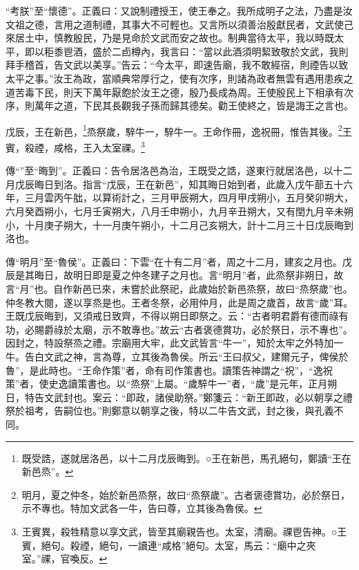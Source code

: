 {\noindent\shu{}\fzkt “考朕”至“懷德”。正義曰：又說制禮授王，使王奉之。我所成明子之法，乃盡是汝文祖之德，言用之道制禮，其事大不可輕也。又言所以須善治殷獻民者，文武使己來居土中，慎教殷民，乃是見命於文武而安之故也。制典當待太平，我以時既太平，即以秬黍鬯酒，盛於二卣樽內，我言曰：“當以此酒須明絜致敬於文武，我則拜手稽首，告文武以美享。”告云：“今太平，即速告廟，我不敢經宿，則禋告以致太平之事。”汝王為政，當順典常厚行之，使有次序，則諸為政者無雲有遇用患疾之道苦毒下民，則天下萬年厭飽於汝王之德，殷乃長成為周。王使殷民上下相承有次序，則萬年之道，下民其長觀我子孫而歸其德矣。勸王使終之，皆是誨王之言也。 \par}

戊辰，王在新邑，\footnote{既受誥，遂就居洛邑，以十二月戊辰晦到。○王在新邑，馬孔絕句，鄭讀“王在新邑烝”。}烝祭歲，騂牛一，騂牛一。王命作冊，逸祝冊，惟告其後。\footnote{明月，夏之仲冬，始於新邑烝祭，故曰“烝祭歲”。古者褒德賞功，必於祭日，示不專也。特加文武各一牛，告曰尊，立其後為魯侯。}王賓，殺禋，咸格，王入太室祼。\footnote{王賓異，殺牲精意以享文武，皆至其廟親告也。太室，清廟。祼鬯告神。○王賓，絕句。殺禋，絕句，一讀連“咸格”絕句。太室，馬云：“廟中之夾室。”祼，官喚反。}


{\noindent\zhuan{}\fzbyks 傳“”至“晦到”。正義曰：告令居洛邑為治，王既受之誥，遂東行就居洛邑，以十二月戊辰晦日到洛。指言“戊辰，王在新邑”，知其晦日始到者，此歲入戊午蔀五十六年，三月雲丙午朏，以算術計之，三月甲辰朔大，四月甲戌朔小，五月癸卯朔大，六月癸酉朔小，七月壬寅朔大，八月壬申朔小，九月辛丑朔大，又有閏九月辛未朔小，十月庚子朔大，十一月庚午朔小，十二月己亥朔大，計十二月三十日戊辰晦到洛也。 \par}

{\noindent\zhuan{}\fzbyks 傳“明月”至“魯侯”。正義曰：下雲“在十有二月”者，周之十二月，建亥之月也。戊辰是其晦日，故明日即是夏之仲冬建子之月也。言“明月”者，此烝祭非朔日，故言“月”也。自作新邑已來，未嘗於此祭祀，此歲始於新邑烝祭，故曰“烝祭歲”也。仲冬教大閱，遂以享烝是也。王者冬祭，必用仲月，此是周之歲首，故言“歲”耳。王既戊辰晦到，又須戒日致齊，不得以朔日即祭之。云：“古者明君爵有德而祿有功，必賜爵祿於太廟，示不敢專也。”故云“古者褒德賞功，必於祭日，示不專也”。因封之，特設祭烝之禮。宗廟用大牢，此文武皆言“牛一”，知於太牢之外特加一牛。告白文武之神，言為尊，立其後為魯侯。所云“王曰叔父，建爾元子，俾侯於魯”，是此時也。“王命作策”者，命有司作策書也。讀策告神謂之“祝”，“逸祝策”者，使史逸讀策書也。以“烝祭”上屬。“歲騂牛一”者，“歲”是元年，正月朔日，特告文武封也。案云：“即政，諸侯助祭。”鄭箋云：“新王即政，必以朝享之禮祭於祖考，告嗣位也。”則鄭意以朝享之後，特以二牛告文武，封之後，與孔義不同。 \par}

